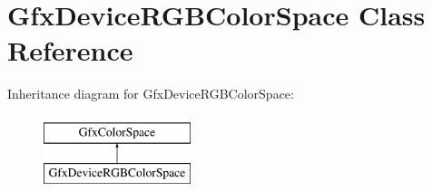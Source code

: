 \hypertarget{class_gfx_device_r_g_b_color_space}{}\section{Gfx\+Device\+R\+G\+B\+Color\+Space Class Reference}
\label{class_gfx_device_r_g_b_color_space}
Inheritance diagram for Gfx\+Device\+R\+G\+B\+Color\+Space\+:\begin{figure}[H]
\begin{center}
\leavevmode
\includegraphics[height=2.000000cm]{class_gfx_device_r_g_b_color_space}
\end{center}
\end{figure}
